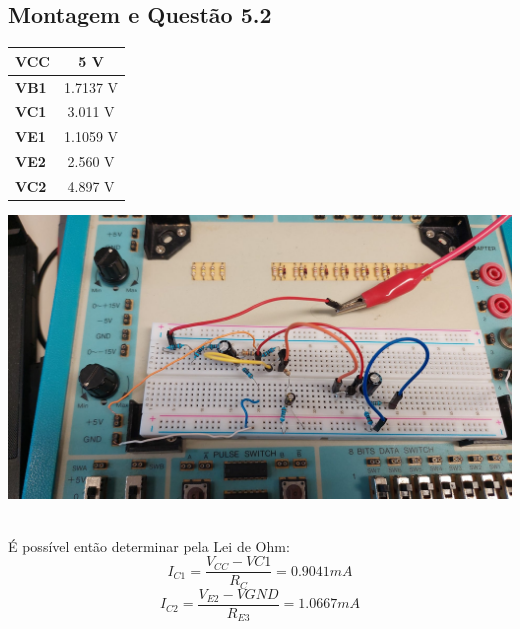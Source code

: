 \documentclass[a4paper,12pt]{article}
\begin{document}
			\subsection{Montagem e Questão 5.2}
					\begin{minipage}{0.45\textwidth}
					\begin{table}[H]
					\begin{tabular}{|l|c|}
						\hline
						\textbf{VCC}  &  5 V\\ \hline
						\textbf{VB1} &  1.7137 V\\ \hline
						\textbf{VC1} &  3.011 V\\ \hline
						\textbf{VE1}  &  1.1059 V\\ \hline
						\textbf{VE2} &  2.560 V\\ \hline
						\textbf{VC2} &  4.897 V\\ \hline
					\end{tabular}

				\end{table}
				\end{minipage}
				 \hfill
                                  \begin{minipage}[]{0.45\textwidth}
                                            \captionsetup{justification=centering}
                                            \includegraphics[scale=0.1\textscale]{montagem.png}

                                  \end{minipage}
				\\ É possível então determinar pela Lei de Ohm:\\
				\begin{equation}
					I_{C1}=\frac{V_{CC}-V{C1}}{R_C}= 0.9041 mA
				\end{equation}
				\begin{equation}
					I_{C2}=\frac{V_{E2}-V{GND}}{R_{E3}}=1.0667 mA
				\end{equation}
\end{document}

